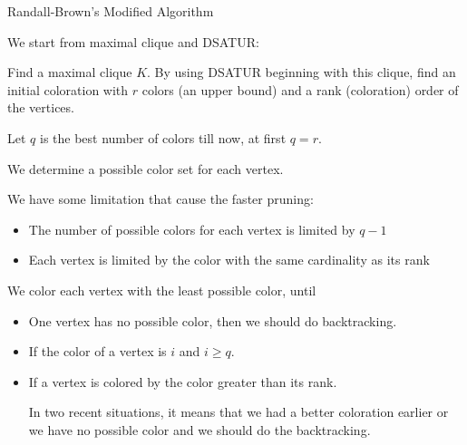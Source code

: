 \documentclass{beamer}
\begin{document}
\begin{frame}{Randall-Brown's Modified Algorithm}
\pause
\begin{itemize}
{\small 
\item We start from maximal clique and DSATUR:

\pause
Find a maximal clique $K$.  By using DSATUR beginning with this clique, find an initial coloration with $r$ colors (an
upper bound) and a rank (coloration) order of the vertices. 

\pause
Let $q$ is the best number of colors till now, at first $q = r$.

\pause
We determine a possible color set for each vertex.
\pause
\item We have some limitation that cause the faster pruning:
\pause
\begin{itemize}
\item The number of possible colors for each vertex is limited by $q-1$
\pause
\item Each vertex is limited by the color with the same cardinality as its rank
\end{itemize}
}
\end{itemize}
\pause
{\small We color each vertex with the least possible color, until
\pause
\begin{itemize}
\item One vertex has no possible color, then we should do backtracking.
\pause
\item If the color of a vertex is $i$ and $i\geq q$.
\pause
\item If a vertex is colored by the color greater than its rank.

\pause
In two recent situations, it means that we had a better coloration earlier or we have no possible color and we should do the backtracking.
\end{itemize}
}
\end{frame}
\end{document}
